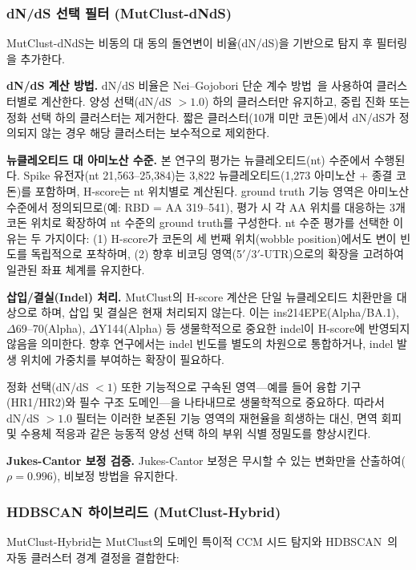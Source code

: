 \subsubsection{dN/dS 선택 필터 (MutClust-dNdS)}

MutClust-dNdS는 비동의 대 동의 돌연변이 비율(dN/dS)을 기반으로 탐지 후 필터링을 추가한다.

\textbf{dN/dS 계산 방법.}
dN/dS 비율은 Nei--Gojobori 단순 계수 방법~\cite{nei1986simple}을 사용하여 클러스터별로 계산한다.
양성 선택(dN/dS $> 1.0$) 하의 클러스터만 유지하고, 중립 진화 또는 정화 선택 하의 클러스터는 제거한다.
짧은 클러스터(10개 미만 코돈)에서 dN/dS가 정의되지 않는 경우 해당 클러스터는 보수적으로 제외한다.

\textbf{뉴클레오티드 대 아미노산 수준.}
본 연구의 평가는 뉴클레오티드(nt) 수준에서 수행된다.
Spike 유전자(nt 21,563--25,384)는 3,822 뉴클레오티드(1,273 아미노산 + 종결 코돈)를 포함하며, H-score는 nt 위치별로 계산된다.
ground truth 기능 영역은 아미노산 수준에서 정의되므로(예: RBD = AA 319--541), 평가 시 각 AA 위치를 대응하는 3개 코돈 위치로 확장하여 nt 수준의 ground truth를 구성한다.
nt 수준 평가를 선택한 이유는 두 가지이다: (1) H-score가 코돈의 세 번째 위치(wobble position)에서도 변이 빈도를 독립적으로 포착하며, (2) 향후 비코딩 영역(5$'$/3$'$-UTR)으로의 확장을 고려하여 일관된 좌표 체계를 유지한다.

\textbf{삽입/결실(Indel) 처리.}
MutClust의 H-score 계산은 단일 뉴클레오티드 치환만을 대상으로 하며, 삽입 및 결실은 현재 처리되지 않는다.
이는 ins214EPE(Alpha/BA.1), $\Delta$69--70(Alpha), $\Delta$Y144(Alpha) 등 생물학적으로 중요한 indel이 H-score에 반영되지 않음을 의미한다.
향후 연구에서는 indel 빈도를 별도의 차원으로 통합하거나, indel 발생 위치에 가중치를 부여하는 확장이 필요하다.

정화 선택(dN/dS $< 1$) 또한 기능적으로 구속된 영역---예를 들어 융합 기구(HR1/HR2)와 필수 구조 도메인---을 나타내므로 생물학적으로 중요하다.
따라서 dN/dS $> 1.0$ 필터는 이러한 보존된 기능 영역의 재현율을 희생하는 대신, 면역 회피 및 수용체 적응과 같은 능동적 양성 선택 하의 부위 식별 정밀도를 향상시킨다.

\textbf{Jukes-Cantor 보정 검증.}
Jukes-Cantor 보정은 무시할 수 있는 변화만을 산출하여($\rho = 0.996$), 비보정 방법을 유지한다.

\subsubsection{HDBSCAN 하이브리드 (MutClust-Hybrid)}

MutClust-Hybrid는 MutClust의 도메인 특이적 CCM 시드 탐지와 HDBSCAN~\cite{campello2013hdbscan}의 자동 클러스터 경계 결정을 결합한다:

